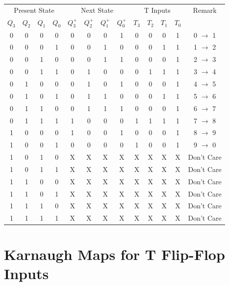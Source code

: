 \documentclass{article}
\begin{document}
    \begin{center}
    \begin{tabular}{cccc|cccc|cccc|c}
    \toprule
    \multicolumn{4}{c|}{Present State} & \multicolumn{4}{c|}{Next State} & \multicolumn{4}{c|}{T Inputs} & Remark \\
    $Q_3$ & $Q_2$ & $Q_1$ & $Q_0$ & $Q_3^+$ & $Q_2^+$ & $Q_1^+$ & $Q_0^+$ & $T_3$ & $T_2$ & $T_1$ & $T_0$ & \\
    \midrule
    0 & 0 & 0 & 0 & 0 & 0 & 0 & 1 & 0 & 0 & 0 & 1 & 0 $\rightarrow$ 1 \\
    0 & 0 & 0 & 1 & 0 & 0 & 1 & 0 & 0 & 0 & 1 & 1 & 1 $\rightarrow$ 2 \\
    0 & 0 & 1 & 0 & 0 & 0 & 1 & 1 & 0 & 0 & 0 & 1 & 2 $\rightarrow$ 3 \\
    0 & 0 & 1 & 1 & 0 & 1 & 0 & 0 & 0 & 1 & 1 & 1 & 3 $\rightarrow$ 4 \\
    0 & 1 & 0 & 0 & 0 & 1 & 0 & 1 & 0 & 0 & 0 & 1 & 4 $\rightarrow$ 5 \\
    0 & 1 & 0 & 1 & 0 & 1 & 1 & 0 & 0 & 0 & 1 & 1 & 5 $\rightarrow$ 6 \\
    0 & 1 & 1 & 0 & 0 & 1 & 1 & 1 & 0 & 0 & 0 & 1 & 6 $\rightarrow$ 7 \\
    0 & 1 & 1 & 1 & 1 & 0 & 0 & 0 & 1 & 1 & 1 & 1 & 7 $\rightarrow$ 8 \\
    1 & 0 & 0 & 0 & 1 & 0 & 0 & 1 & 0 & 0 & 0 & 1 & 8 $\rightarrow$ 9 \\
    1 & 0 & 0 & 1 & 0 & 0 & 0 & 0 & 1 & 0 & 0 & 1 & 9 $\rightarrow$ 0 \\
    \midrule
    1 & 0 & 1 & 0 & X & X & X & X & X & X & X & X & Don't Care \\
    1 & 0 & 1 & 1 & X & X & X & X & X & X & X & X & Don't Care \\
    1 & 1 & 0 & 0 & X & X & X & X & X & X & X & X & Don't Care \\
    1 & 1 & 0 & 1 & X & X & X & X & X & X & X & X & Don't Care \\
    1 & 1 & 1 & 0 & X & X & X & X & X & X & X & X & Don't Care \\
    1 & 1 & 1 & 1 & X & X & X & X & X & X & X & X & Don't Care \\
    \bottomrule
    \end{tabular}
    \end{center}
    \section*{Karnaugh Maps for T Flip-Flop Inputs}
    
\end{document}
